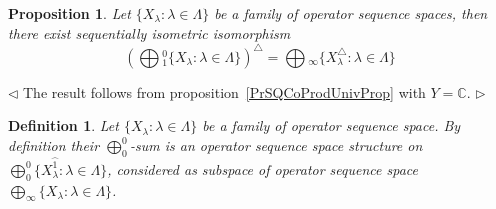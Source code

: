 \documentclass[12pt]{article}
\newtheorem{proposition}[theorem]{Proposition}
\newtheorem{definition}[theorem]{Definition}
\newenvironment{proof}{\par $\triangleleft$}{$\triangleright$}
\begin{document}
\begin{proposition}\label{PrDualOfCoprodIsProd}
Let $ \{X_\lambda:\lambda\in \Lambda \}$ be a family 
of operator sequence spaces, then there exist sequentially 
isometric isomorphism
$$
{\left(\bigoplus{}_1^0 \{X_\lambda:\lambda\in \Lambda \}\right)}^\triangle
=\bigoplus{}_\infty \{X_\lambda^\triangle:\lambda\in \Lambda \}
$$
\end{proposition}
\begin{proof}
The result follows from proposition~\ref{PrSQCoProdUnivProp} 
with $Y=\mathbb{C}$.
\end{proof}

\begin{definition}\label{DefSQc0Sum}
Let $ \{X_\lambda: \lambda \in \Lambda \}$ be a family of operator sequence
space. By definition their $\bigoplus_0^0$-sum  is an operator sequence space
structure on $\bigoplus_0^0 \{X_\lambda^{\wideparen{1}}:\lambda\in \Lambda \}$,
considered 
as subspace of operator sequence space 
$\bigoplus_\infty \{X_\lambda:\lambda\in \Lambda \}$.
\end{definition}
\end{document}
